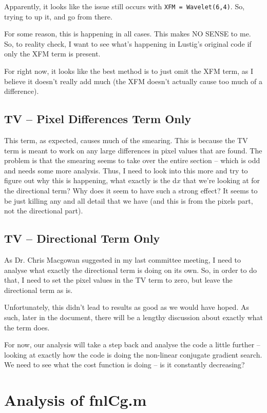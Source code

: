 \documentclass[11 pt]{article}
\let\oldsection\section
\renewcommand\section{\clearpage\newpage\oldsection}
\begin{document}
    Apparently, it looks like the issue still occurs with \texttt{XFM = Wavelet(6,4)}. So, trying to up it, and go from there. 

    For some reason, this is happening in all cases. This makes NO SENSE to me. So, to reality check, I want to see what's happening in Lustig's original code if only the XFM term is present. 

    For right now, it looks like the best method is to just omit the XFM term, as I believe it doesn't really add much (the XFM doesn't actually cause too much of a difference).


    \subsection{TV -- Pixel Differences Term Only}

      This term, as expected, causes much of the smearing. This is because the TV term is meant to work on any large differences in pixel values that are found.  The problem is that the smearing seems to take over the entire section -- which is odd and needs some more analysis. Thus, I need to look into this more and try to figure out why this is happening, what exactly is the d$x$ that we're looking at for the directional term? Why does it seem to have such a strong effect? It seems to be just killing any and all detail that we have (and this is from the pixels part, not the directional part).

    \subsection{TV -- Directional Term Only}

      As Dr. Chris Macgowan suggested in my last committee meeting, I need to analyse what exactly the directional term is doing on its own. So, in order to do that, I need to set the pixel values in the TV term to zero, but leave the directional term as is. 

      Unfortunately, this didn't lead to results as good as we would have hoped. As such, later in the document, there will be a lengthy discussion about exactly what the term does. 

      For now, our analysis will take a step back and analyse the code a little further -- looking at exactly how the code is doing the non-linear conjugate gradient search. We need to see what the cost function is doing -- is it constantly decreasing? 

\section{Analysis of fnlCg.m}
\end{document}

